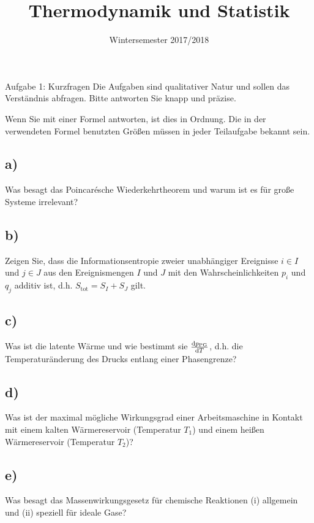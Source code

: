 

\subject{TuS}
\title{Thermodynamik und Statistik}
\date{
    Wintersemester 2017/2018
}



\maketitle
\thispagestyle{empty}
\newpage


\begin{aufgabe}{Aufgabe 1: Kurzfragen}
Die Aufgaben sind qualitativer Natur und sollen das Verständnis abfragen.
Bitte antworten Sie knapp und präzise.

Wenn Sie mit einer Formel antworten, ist dies in Ordnung.
Die in der verwendeten Formel benutzten Größen müssen in jeder Teilaufgabe bekannt sein.

\subsection{a)}
Was besagt das Poincarésche Wiederkehrtheorem und warum ist es für große Systeme irrelevant?

\subsection{b)}
Zeigen Sie, dass die Informationsentropie zweier unabhängiger Ereignisse $i \in I$ und $j \in J$ aus den Ereignismengen $I$ und $J$ mit den Wahrscheinlichkeiten $p_i$ und $q_j$ additiv ist, d.h. $S_\text{tot} = S_I + S_J$ gilt.

\subsection{c)}
Was ist die latente Wärme und wie bestimmt sie $\frac{\mathrm{d} p_\text{PG}}{\mathrm{d} T}$, d.h. die Temperaturänderung des Drucks entlang einer Phasengrenze?


\subsection{d)}
Was ist der maximal mögliche Wirkungsgrad einer Arbeitsmaschine in Kontakt mit einem kalten Wärmereservoir (Temperatur $T_1$) und einem heißen Wärmereservoir (Temperatur $T_2$)?

\subsection{e)}
Was besagt das Massenwirkungsgesetz für chemische Reaktionen
(i) allgemein und
(ii) speziell für ideale Gase?


\end{aufgabe}

